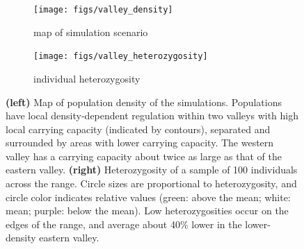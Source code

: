 \documentclass{ar-1col}
\begin{document}
\begin{figure}[h]
    \centering
    \begin{subfigure}{0.45\textwidth}
        \centering
        \texttt{[image: figs/valley\_density]}
        \caption{map of simulation scenario}
        \label{valley_map}
    \end{subfigure}
    \begin{subfigure}{0.45\textwidth}
        \centering
        \texttt{[image: figs/valley\_heterozygosity]}
        \caption{individual heterozygosity}
        \label{valley_het}
    \end{subfigure}
        \caption{
            \textbf{(left)} Map of population density of the simulations.
            Populations have local density-dependent regulation
            within two valleys with high local carrying capacity (indicated by contours),
            separated and surrounded by areas with lower carrying capacity.
            The western valley has a carrying capacity about twice as large as that of the eastern valley.
            \textbf{(right)} Heterozygosity of a sample of 100 individuals across the range.
            Circle sizes are proportional to heterozygosity,
            and circle color indicates relative values
            (green: above the mean; white: mean; purple: below the mean).
            Low heterozygosities occur on the edges of the range,
            and average about 40\% lower in the lower-density eastern valley.
		}
        \label{pop_density}
\end{figure}
\end{document}
